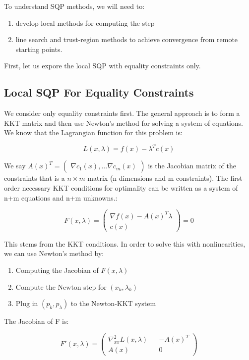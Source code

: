 \documentclass[class=article, crop=false]{standalone}
\begin{document}
	To understand SQP methods, we will need to:

	\begin{enumerate}
		\item develop local methods for computing the step 
		\item line search and trust-region methods to achieve convergence from remote starting points.
	\end{enumerate}

	First, let us expore the local SQP with equality constraints only.

	\subsection{Local SQP For Equality Constraints}

		We consider only equality constraints first. The general approach is to form a KKT matrix and then use Newton's method for solving a system of equations. We know that the Lagrangian function for this problem is:

			$$L(x, \lambda) = f(x) - \lambda^T c(x)$$

		We say $A(x)^T = \begin{pmatrix} \nabla c_1(x), \hdots \nabla c_m(x) \end{pmatrix}$ is the Jacobian matrix of the constraints that is a $n \times m$ matrix (n dimensions and m constraints). The first-order necessary KKT conditions for optimality can be written as a system of n+m equations and n+m unknowns.:

			$$F(x, \lambda) = \begin{pmatrix} \nabla f(x) - A(x)^T \lambda \\ c(x) \end{pmatrix} = 0$$

		This stems from the KKT conditions. In order to solve this with nonlinearities, we can use Newton's method by:

		\begin{enumerate}
			\item Computing the Jacobian of $F(x, \lambda)$
			\item Compute the Newton step for $(x_k, \lambda_k)$
			\item Plug in $(p_k, p_\lambda)$ to the Newton-KKT system
		\end{enumerate}

		The Jacobian of F is:

			$$F'(x, \lambda) = \begin{pmatrix} \nabla_{xx}^2 L(x, \lambda) && -A(x)^T \\ A(x) && 0 \end{pmatrix}$$
\end{document}
